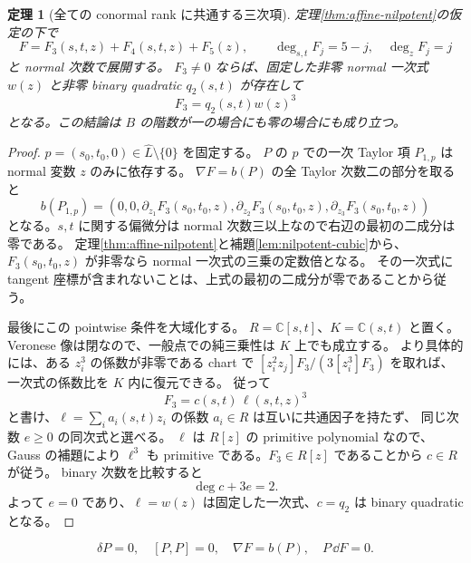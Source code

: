 \documentclass[11pt,a4paper]{ltjsarticle}
\newtheorem{theorem}{定理}[section]
\theoremstyle{remark}\newtheorem{remark}[theorem]{注意}
\begin{document}
\begin{theorem}[全ての conormal rank に共通する三次項]
\label{thm:fixed-cubic}
定理\ref{thm:affine-nilpotent}の仮定の下で
\[
       F=F_3(s,t,z)+F_4(s,t,z)+F_5(z),
       \qquad \deg_{s,t}F_j=5-j,\quad \deg_zF_j=j
\]
と normal 次数で展開する。
$F_3\ne0$ ならば、固定した非零 normal 一次式 $w(z)$ と非零 binary quadratic
$q_2(s,t)$ が存在して
\begin{equation}\label{eq:fixed-cubic}
                              F_3=q_2(s,t)w(z)^3
\end{equation}
となる。この結論は $B$ の階数が一の場合にも零の場合にも成り立つ。
\end{theorem}
\begin{proof}
$p=(s_0,t_0,0)\in\widehat L\setminus\{0\}$ を固定する。
$P$ の $p$ での一次 Taylor 項 $P_{1,p}$ は normal 変数 $z$ のみに依存する。
$\nabla F=b(P)$ の全 Taylor 次数二の部分を取ると
\[
          b(P_{1,p})=
           (0,0,\partial_{z_1}F_3(s_0,t_0,z),
                  \partial_{z_2}F_3(s_0,t_0,z),
                  \partial_{z_3}F_3(s_0,t_0,z))
\]
となる。$s,t$ に関する偏微分は normal 次数三以上なので右辺の最初の二成分は零である。
定理\ref{thm:affine-nilpotent}と補題\ref{lem:nilpotent-cubic}から、
$F_3(s_0,t_0,z)$ が非零なら normal 一次式の三乗の定数倍となる。
その一次式に tangent 座標が含まれないことは、上式の最初の二成分が零であることから従う。

最後にこの pointwise 条件を大域化する。
$R=\mathbb C[s,t]$、$K=\mathbb C(s,t)$ と置く。
Veronese 像は閉なので、一般点での純三乗性は $K$ 上でも成立する。
より具体的には、ある $z_i^3$ の係数が非零である chart で
$[z_i^2z_j]F_3/(3[z_i^3]F_3)$ を取れば、一次式の係数比を $K$ 内に復元できる。
従って
\[
                    F_3=c(s,t)\,\ell(s,t,z)^3
\]
と書け、$\ell=\sum_i a_i(s,t)z_i$ の係数 $a_i\in R$ は互いに共通因子を持たず、
同じ次数 $e\ge0$ の同次式と選べる。
$\ell$ は $R[z]$ の primitive polynomial なので、Gauss の補題により $\ell^3$ も
primitive である。$F_3\in R[z]$ であることから $c\in R$ が従う。
binary 次数を比較すると
\[
                              \deg c+3e=2.
\]
よって $e=0$ であり、$\ell=w(z)$ は固定した一次式、$c=q_2$ は binary quadratic となる。
\end{proof}



\begin{equation}\label{eq:canonical}
\delta P=0,\quad[P,P]=0,\quad\nabla F=b(P),\quad P\,\dd F=0.
\end{equation}
\end{document}

